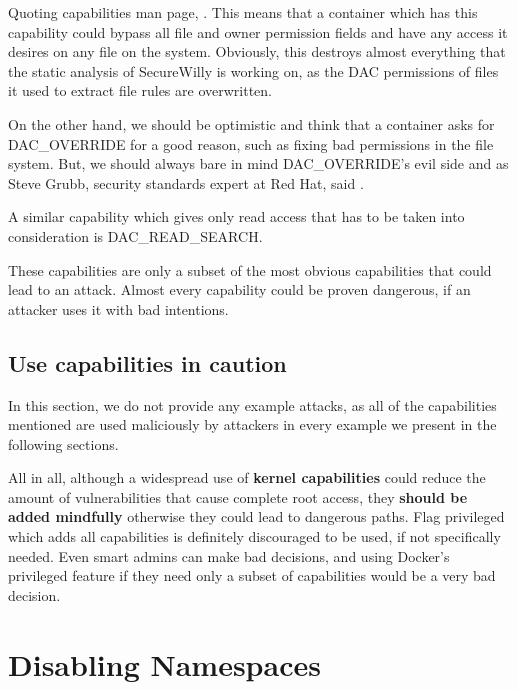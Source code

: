 \begin{description}[style=nextline]
\item[DAC\_OVERRIDE]
Quoting capabilities man page, .
This means that a container which has this capability could bypass all file and owner permission fields and have any access it desires on any file on the system. Obviously, this destroys almost everything that the static analysis of SecureWilly is working on, as the DAC permissions of files it used to extract file rules are overwritten. 

On the other hand, we should be optimistic and think that a container asks for DAC\_OVERRIDE for a good reason, such as fixing bad permissions in the file system.
But, we should always bare in mind DAC\_OVERRIDE's evil side and as Steve Grubb, security standards expert at Red Hat, said .

A similar capability which gives only read access that has to be taken into consideration is DAC\_READ\_SEARCH.
\end{description}

These capabilities are only a subset of the most obvious capabilities that could lead to an attack. Almost every capability could be proven dangerous, if an attacker uses it with bad intentions. 

\subsection{Use capabilities in caution}
In this section, we do not provide any example attacks, as all of the capabilities mentioned are used maliciously by attackers in every example we present in the following sections.

All in all, although a widespread use of \textbf{kernel capabilities} could reduce the amount of vulnerabilities that cause complete root access, they \textbf{should be added mindfully} otherwise they could lead to dangerous paths. 
Flag privileged which adds all capabilities is definitely discouraged to be used, if not specifically needed. Even smart admins can make bad decisions, and using Docker's privileged feature if they need only a subset of capabilities would be a very bad decision.

\section{Disabling Namespaces}

